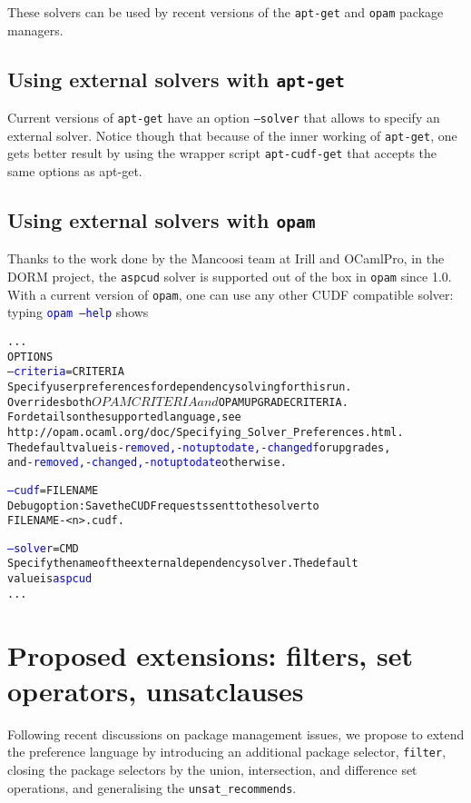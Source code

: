 \documentclass{article}
\begin{document}
These solvers can be used by recent versions of the \texttt{apt-get} and \texttt{opam} package managers.

\subsection{Using external solvers with \texttt{apt-get}}

Current versions of \texttt{apt-get} have an option \texttt{--solver} that allows to specify an external
solver. Notice though that because of the inner working of \texttt{apt-get}, one gets better result
by using the wrapper script \texttt{apt-cudf-get} that accepts the same options as apt-get.

\subsection{Using external solvers with \texttt{opam}}
Thanks to the work done by the Mancoosi team at Irill and OCamlPro, in the DORM project,
the \texttt{aspcud} solver is supported out of the box in \texttt{opam} since 1.0.
With a current version of \texttt{opam}, one can use any other CUDF compatible solver:
typing \textcolor{blue}{\texttt{opam --help}} shows 

\begin{alltt}
...
OPTIONS
  \textcolor{blue}{--criteria}=CRITERIA
      Specify user preferences for dependency solving for this run.
      Overrides both $OPAMCRITERIA and $OPAMUPGRADECRITERIA. 
      For details on the supported language, see
      http://opam.ocaml.org/doc/Specifying_Solver_Preferences.html. 
      The default value is \textcolor{blue}{-removed,-notuptodate,-changed} for upgrades,
      and \textcolor{blue}{-removed,-changed,-notuptodate} otherwise.

  \textcolor{blue}{--cudf}=FILENAME
      Debug option: Save the CUDF requests sent to the solver to
      FILENAME-<n>.cudf.

  \textcolor{blue}{--solver}=CMD
      Specify the name of the external dependency solver. The default
      value is \textcolor{blue}{aspcud}
...
\end{alltt}

\section{Proposed extensions: filters, set operators, unsatclauses}\label{sect:filtersel}

Following recent discussions on package management issues, we propose to extend
the preference language by introducing an additional package selector,
\texttt{filter}, closing the package selectors by the union, intersection,
and difference set operations, and generalising the \texttt{unsat\_recommends}. \\
\end{document}
